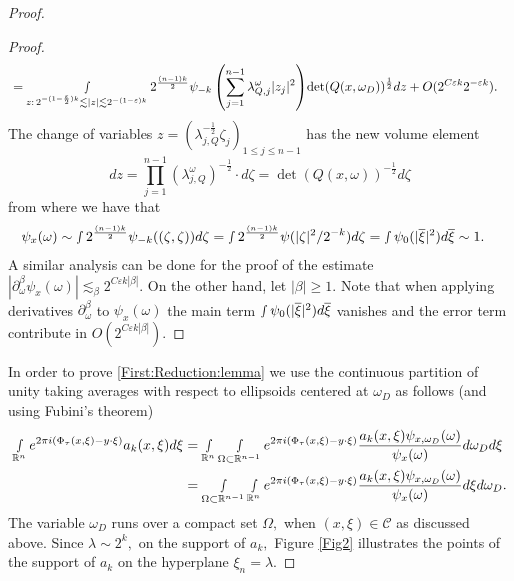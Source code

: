 \documentclass[12pt, reqno]{amsart}
\theoremstyle{definition}
\theoremstyle{remark}
\numberwithin{equation}{section}
\begin{document}
\begin{proof}
\begin{proof}
\begin{align*}
          &=\smallint_{ z:\,2^{-(1-\frac{\varepsilon}{2})k }\lesssim  |z|\lesssim 2^{-(1-\varepsilon)k } }
         { 2^{\frac{(n-1)k}{2}}\psi_{-k}\left(  \sum_{j=1}^{n-1}\lambda_{Q,j}^\omega|z_j|^2  \right)   }{\det(Q(x,\omega_D))^{\frac{1}{2}}}dz+O(2^{C\varepsilon k}2^{-\varepsilon k}).
\end{align*}The change of variables $z=(\lambda_{j,Q}^{-\frac{1}{2}}\zeta_j)_{1\leq j\leq n-1}$ has the new volume element
\begin{equation}
    dz=\prod_{j=1}^{n-1}(\lambda_{j,Q}^\omega)^{-\frac{1}{2}}\cdot d\zeta=\det(Q(x,\omega))^{-\frac{1}{2}}d\zeta
\end{equation} from where we have that
\begin{align*}
     \psi_{x}(\omega)   &\sim \smallint
         { 2^{\frac{(n-1)k}{2}}\psi_{-k} ((\zeta,\zeta))  }d\zeta=\smallint
         { 2^{\frac{(n-1)k}{2}}\psi(|\zeta|^{2}/2^{-k})  }d\zeta=\smallint\psi_0(|\overline{\xi}|^2)d\overline{\xi}\sim 1.
\end{align*}A similar analysis can be done for the proof of the estimate $|\partial^\beta_\omega \psi_{x}(\omega) |\lesssim_{\beta}2^{C\varepsilon k|\beta|}. $ On the other hand,  let $|\beta|\geq 1.$  Note that when applying derivatives $\partial_{\omega}^{\beta}$ to $\psi_x(\omega)$ the main term $\smallint\psi_0(|\overline{\xi}|^2)d\overline{\xi}$ vanishes  and the error term contribute in $O(2^{C\varepsilon k|\beta|}).$ 
\end{proof}

In order to prove \eqref{First:Reduction:lemma}
we use the continuous partition of unity taking averages with respect to ellipsoids centered at $\omega_D$ as follows (and using Fubini's theorem)
\begin{align*}
    \smallint\limits_{\mathbb{R}^n}e^{2\pi i(\Phi_\tau(x,\xi)-y\cdot \xi)}a_k(x,\xi)d\xi &= \smallint\limits_{\mathbb{R}^n}\smallint\limits_{\Omega\subset \mathbb{R}^{n-1} }e^{2\pi i(\Phi_\tau(x,\xi)-y\cdot \xi)} \frac{ a_k(x,\xi) \psi_{x,\omega_D}(\omega)  }{\psi_{x}(\omega)} d\omega_D d\xi\\
    &=\smallint\limits_{\Omega\subset \mathbb{R}^{n-1} } \smallint\limits_{\mathbb{R}^n} e^{2\pi i(\Phi_\tau(x,\xi)-y\cdot \xi)} \frac{ a_k(x,\xi) \psi_{x,\omega_D}(\omega)  }{\psi_{x}(\omega)}  d\xi d\omega_D.
\end{align*}The variable $\omega_D$ runs over a compact set $\Omega,$ when $(x,\xi)\in \mathscr{C}$ as discussed above. Since $\lambda\sim 2^k,$ on the support of $a_{k},$ Figure \ref{Fig2}  illustrates the points of the support of $a_k$ on the hyperplane $\xi_n=\lambda.$


\end{proof}
\end{document}
